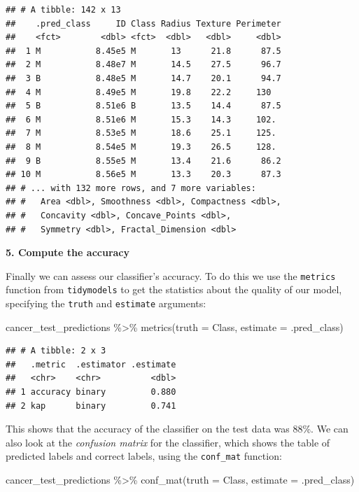 \documentclass[
]{krantz}
\makeatletter
\newenvironment{Shaded}{\begin{snugshade}}{\end{snugshade}}
\newcommand{\AttributeTok}[1]{\textcolor[rgb]{0.61,0.61,0.61}{#1}}
\newcommand{\FunctionTok}[1]{\textcolor[rgb]{0,0,0}{#1}}
\newcommand{\NormalTok}[1]{#1}
\newcommand{\SpecialCharTok}[1]{\textcolor[rgb]{0,0,0}{#1}}
\newenvironment{kframe}{%
\medskip{}
\setlength{\fboxsep}{.8em}
 \def\at@end@of@kframe{}%
 \ifinner\ifhmode%
  \def\at@end@of@kframe{\end{minipage}}%
  \begin{minipage}{\columnwidth}%
 \fi\fi%
 \def\FrameCommand##1{\hskip\@totalleftmargin \hskip-\fboxsep
 \colorbox{shadecolor}{##1}\hskip-\fboxsep
     \hskip-\linewidth \hskip-\@totalleftmargin \hskip\columnwidth}%
 \MakeFramed {\advance\hsize-\width
   \@totalleftmargin\z@ \linewidth\hsize
   \@setminipage}}%
 {\par\unskip\endMakeFramed%
 \at@end@of@kframe}
\renewenvironment{Shaded}{\begin{kframe}}{\end{kframe}}
\makeatother
\begin{document}
\begin{verbatim}
## # A tibble: 142 x 13
##    .pred_class     ID Class Radius Texture Perimeter
##    <fct>        <dbl> <fct>  <dbl>   <dbl>     <dbl>
##  1 M           8.45e5 M       13      21.8      87.5
##  2 M           8.48e7 M       14.5    27.5      96.7
##  3 B           8.48e5 M       14.7    20.1      94.7
##  4 M           8.49e5 M       19.8    22.2     130  
##  5 B           8.51e6 B       13.5    14.4      87.5
##  6 M           8.51e6 M       15.3    14.3     102. 
##  7 M           8.53e5 M       18.6    25.1     125. 
##  8 M           8.54e5 M       19.3    26.5     128. 
##  9 B           8.55e5 M       13.4    21.6      86.2
## 10 M           8.56e5 M       13.3    20.3      87.3
## # ... with 132 more rows, and 7 more variables:
## #   Area <dbl>, Smoothness <dbl>, Compactness <dbl>,
## #   Concavity <dbl>, Concave_Points <dbl>,
## #   Symmetry <dbl>, Fractal_Dimension <dbl>
\end{verbatim}

\textbf{5. Compute the accuracy}

Finally we can assess our classifier's accuracy. To do this we use the \texttt{metrics} function
from \texttt{tidymodels} to get the statistics about the quality of our model, specifying
the \texttt{truth} and \texttt{estimate} arguments:

\begin{Shaded}
\begin{Highlighting}[]
\NormalTok{cancer\_test\_predictions }\SpecialCharTok{\%\textgreater{}\%}
  \FunctionTok{metrics}\NormalTok{(}\AttributeTok{truth =}\NormalTok{ Class, }\AttributeTok{estimate =}\NormalTok{ .pred\_class)}
\end{Highlighting}
\end{Shaded}

\begin{verbatim}
## # A tibble: 2 x 3
##   .metric  .estimator .estimate
##   <chr>    <chr>          <dbl>
## 1 accuracy binary         0.880
## 2 kap      binary         0.741
\end{verbatim}

This shows that the accuracy of the classifier on the test data was 88\%.
We can also look at the \emph{confusion matrix} for the classifier, which shows
the table of predicted labels and correct labels, using the \texttt{conf\_mat} function:

\begin{Shaded}
\begin{Highlighting}[]
\NormalTok{cancer\_test\_predictions }\SpecialCharTok{\%\textgreater{}\%}
  \FunctionTok{conf\_mat}\NormalTok{(}\AttributeTok{truth =}\NormalTok{ Class, }\AttributeTok{estimate =}\NormalTok{ .pred\_class)}
\end{Highlighting}
\end{Shaded}
\end{document}

